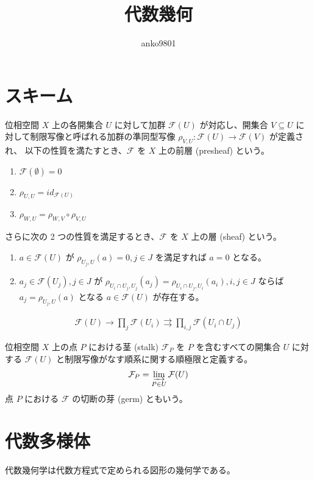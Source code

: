 \documentclass[uplatex,dvipdfmx,a4paper,11pt]{jlreq}
\title{代数幾何}
\author{anko9801}
\newcommand{\FF}{\mathcal{F}}
\numberwithin{equation}{section}
\theoremstyle{definition}
\begin{document}
\maketitle
\tableofcontents
\clearpage

\section{スキーム}
\begin{definition}[前層]
  位相空間 $X$ 上の各開集合 $U$ に対して加群 $\mathcal{F}(U)$ が対応し、開集合 $V\subseteq U$ に対して制限写像と呼ばれる加群の準同型写像 $\rho_{V,U}: \FF(U)\to\FF(V)$ が定義され、
  以下の性質を満たすとき、$\mathcal{F}$ を $X$ 上の前層 (presheaf) という。
  \begin{enumerate}
    \item $\FF(\emptyset) = 0$
    \item $\rho_{U, U} = id_{\FF(U)}$
    \item $\rho_{W, U} = \rho_{W,V}\circ\rho_{V,U}$
  \end{enumerate}
\end{definition}

\begin{definition}[層]
  さらに次の 2 つの性質を満足するとき、$\mathcal{F}$ を $X$ 上の層 (sheaf) という。
  \begin{enumerate}
    \item $a\in\FF(U)$ が $\rho_{U_j, U}(a) = 0, j\in J$ を満足すれば $a = 0$ となる。
    \item $a_j\in\FF(U_j), j\in J$ が $\rho_{U_i\cap U_j, U_j}(a_j) = \rho_{U_i\cap U_j, U_i}(a_i), i,j\in J$ ならば $a_j = \rho_{U_j,U}(a)$ となる $a\in\FF(U)$ が存在する。
  \end{enumerate}
  \begin{align}
    \FF(U) \to \prod_j\FF(U_i) \rightrightarrows \prod_{i,j}\FF(U_i\cap U_j)
  \end{align}
\end{definition}

位相空間 $X$ 上の点 $P$ における茎 (stalk) $\FF_P$ を $P$ を含むすべての開集合 $U$ に対する $\FF(U)$ と制限写像がなす順系に関する順極限と定義する。
\begin{align}
  \FF_P = \varinjlim_{P\in U}\FF(U)
\end{align}
点 $P$ における $\FF$ の切断の芽 (germ) ともいう。

\section{代数多様体}
代数幾何学は代数方程式で定められる図形の幾何学である。
\end{document}
